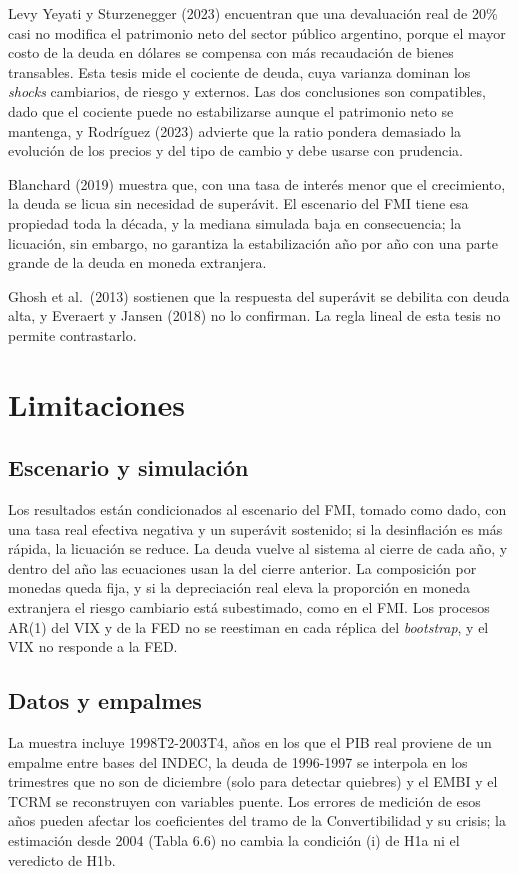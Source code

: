 Levy Yeyati y Sturzenegger (2023) encuentran que una devaluación real de
20\% casi no modifica el patrimonio neto del sector público argentino,
porque el mayor costo de la deuda en dólares se compensa con más
recaudación de bienes transables. Esta tesis mide el cociente de deuda,
cuya varianza dominan los \emph{shocks} cambiarios, de riesgo y
externos. Las dos conclusiones son compatibles, dado que el cociente
puede no estabilizarse aunque el patrimonio neto se mantenga, y
Rodríguez (2023) advierte que la ratio pondera demasiado la evolución de
los precios y del tipo de cambio y debe usarse con prudencia.

Blanchard (2019) muestra que, con una tasa de interés menor que el
crecimiento, la deuda se licua sin necesidad de superávit. El escenario
del FMI tiene esa propiedad toda la década, y la mediana simulada baja
en consecuencia; la licuación, sin embargo, no garantiza la
estabilización año por año con una parte grande de la deuda en moneda
extranjera.

Ghosh et al.~(2013) sostienen que la respuesta del superávit se debilita
con deuda alta, y Everaert y Jansen (2018) no lo confirman. La regla
lineal de esta tesis no permite contrastarlo.

\section{Limitaciones}

\subsection{Escenario y simulación}

Los resultados están condicionados al escenario del FMI, tomado como
dado, con una tasa real efectiva negativa y un superávit sostenido; si
la desinflación es más rápida, la licuación se reduce. La deuda vuelve
al sistema al cierre de cada año, y dentro del año las ecuaciones usan
la del cierre anterior. La composición por monedas queda fija, y si la
depreciación real eleva la proporción en moneda extranjera el riesgo
cambiario está subestimado, como en el FMI. Los procesos AR(1) del VIX y
de la FED no se reestiman en cada réplica del \emph{bootstrap}, y el VIX
no responde a la FED.

\subsection{Datos y empalmes}

La muestra incluye 1998T2-2003T4, años en los que el PIB real proviene
de un empalme entre bases del INDEC, la deuda de 1996-1997 se interpola
en los trimestres que no son de diciembre (solo para detectar quiebres)
y el EMBI y el TCRM se reconstruyen con variables puente. Los errores de
medición de esos años pueden afectar los coeficientes del tramo de la
Convertibilidad y su crisis; la estimación desde 2004 (Tabla 6.6) no
cambia la condición (i) de H1a ni el veredicto de H1b.

